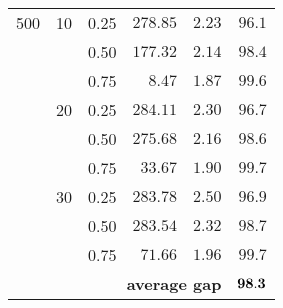 \begin{center}
\begin{tabular}[c]{|r|r|r|rrr|}
500 & 10 & 0.25 & $278.85$ & $  2.23$  & $96.1$ \\
    &    & 0.50 & $177.32$ & $  2.14$  & $98.4$ \\
    &    & 0.75 & $  8.47$ & $  1.87$  & $99.6$ \\ \cline{2-6}
    & 20 & 0.25 & $284.11$ & $  2.30$  & $96.7$ \\
    &    & 0.50 & $275.68$ & $  2.16$  & $98.6$ \\
    &    & 0.75 & $ 33.67$ & $  1.90$  & $99.7$ \\ \cline{2-6}
    & 30 & 0.25 & $283.78$ & $  2.50$  & $96.9$ \\
    &    & 0.50 & $283.54$ & $  2.32$  & $98.7$ \\
    &    & 0.75 & $ 71.66$ & $  1.96$  & $99.7$ \\ \cline{2-6}
    & \multicolumn{4}{r}{\textbf{average gap}}  & $\bf 98.3$  \\ \hline
\end{tabular}
\end{center}
